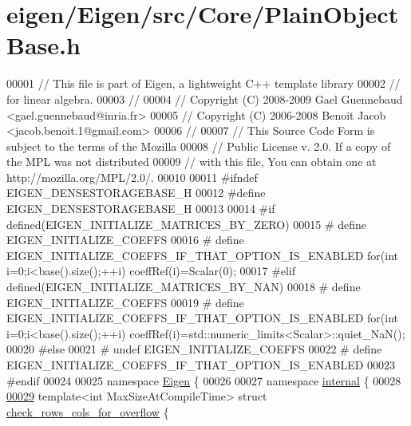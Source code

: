\hypertarget{eigen_2_eigen_2src_2_core_2_plain_object_base_8h_source}{}\section{eigen/\+Eigen/src/\+Core/\+Plain\+Object\+Base.h}
\label{eigen_2_eigen_2src_2_core_2_plain_object_base_8h_source}

\begin{DoxyCode}
00001 \textcolor{comment}{// This file is part of Eigen, a lightweight C++ template library}
00002 \textcolor{comment}{// for linear algebra.}
00003 \textcolor{comment}{//}
00004 \textcolor{comment}{// Copyright (C) 2008-2009 Gael Guennebaud <gael.guennebaud@inria.fr>}
00005 \textcolor{comment}{// Copyright (C) 2006-2008 Benoit Jacob <jacob.benoit.1@gmail.com>}
00006 \textcolor{comment}{//}
00007 \textcolor{comment}{// This Source Code Form is subject to the terms of the Mozilla}
00008 \textcolor{comment}{// Public License v. 2.0. If a copy of the MPL was not distributed}
00009 \textcolor{comment}{// with this file, You can obtain one at http://mozilla.org/MPL/2.0/.}
00010 
00011 \textcolor{preprocessor}{#ifndef EIGEN\_DENSESTORAGEBASE\_H}
00012 \textcolor{preprocessor}{#define EIGEN\_DENSESTORAGEBASE\_H}
00013 
00014 \textcolor{preprocessor}{#if defined(EIGEN\_INITIALIZE\_MATRICES\_BY\_ZERO)}
00015 \textcolor{preprocessor}{# define EIGEN\_INITIALIZE\_COEFFS}
00016 \textcolor{preprocessor}{# define EIGEN\_INITIALIZE\_COEFFS\_IF\_THAT\_OPTION\_IS\_ENABLED for(int i=0;i<base().size();++i)
       coeffRef(i)=Scalar(0);}
00017 \textcolor{preprocessor}{#elif defined(EIGEN\_INITIALIZE\_MATRICES\_BY\_NAN)}
00018 \textcolor{preprocessor}{# define EIGEN\_INITIALIZE\_COEFFS}
00019 \textcolor{preprocessor}{# define EIGEN\_INITIALIZE\_COEFFS\_IF\_THAT\_OPTION\_IS\_ENABLED for(int i=0;i<base().size();++i)
       coeffRef(i)=std::numeric\_limits<Scalar>::quiet\_NaN();}
00020 \textcolor{preprocessor}{#else}
00021 \textcolor{preprocessor}{# undef EIGEN\_INITIALIZE\_COEFFS}
00022 \textcolor{preprocessor}{# define EIGEN\_INITIALIZE\_COEFFS\_IF\_THAT\_OPTION\_IS\_ENABLED}
00023 \textcolor{preprocessor}{#endif}
00024 
00025 \textcolor{keyword}{namespace }\hyperlink{namespace_eigen}{Eigen} \{
00026 
00027 \textcolor{keyword}{namespace }\hyperlink{namespaceinternal}{internal} \{
00028 
\hyperlink{struct_eigen_1_1internal_1_1check__rows__cols__for__overflow}{00029} \textcolor{keyword}{template}<\textcolor{keywordtype}{int} MaxSizeAtCompileTime> \textcolor{keyword}{struct }\hyperlink{struct_eigen_1_1internal_1_1check__rows__cols__for__overflow}{check\_rows\_cols\_for\_overflow} \{

\end{DoxyCode}

